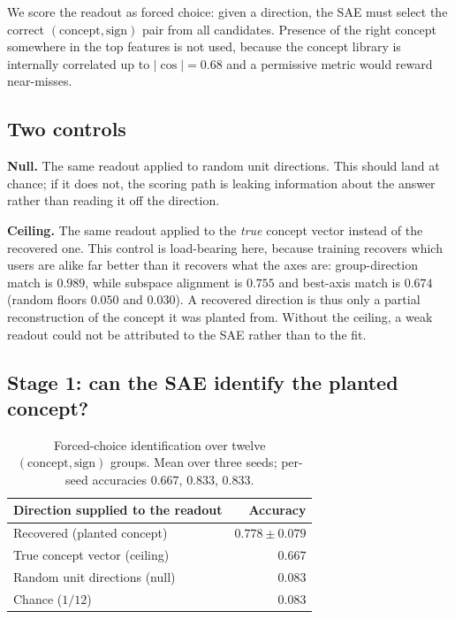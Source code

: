 We score the readout as forced choice: given a direction, the SAE must select
the correct $(\text{concept},\text{sign})$ pair from all candidates. Presence of
the right concept somewhere in the top features is not used, because the concept
library is internally correlated up to $|\cos| = 0.68$ and a permissive metric
would reward near-misses.

\subsection{Two controls}

\textbf{Null.} The same readout applied to random unit directions. This should
land at chance; if it does not, the scoring path is leaking information about
the answer rather than reading it off the direction.

\textbf{Ceiling.} The same readout applied to the \emph{true} concept vector
instead of the recovered one. This control is load-bearing here, because
training recovers which users are alike far better than it recovers what the
axes are: group-direction match is $0.989$, while subspace alignment is $0.755$
and best-axis match is $0.674$ (random floors $0.050$ and $0.030$). A recovered
direction is thus only a partial reconstruction of the concept it was planted
from. Without the ceiling, a weak readout could not be attributed to the SAE
rather than to the fit.

\subsection{Stage 1: can the SAE identify the planted concept?}

\begin{table}[h]
\centering
\begin{tabular}{lr}
\toprule
Direction supplied to the readout & Accuracy \\
\midrule
Recovered (planted concept)       & $0.778 \pm 0.079$ \\
True concept vector (ceiling)     & $0.667$ \\
Random unit directions (null)     & $0.083$ \\
\midrule
Chance ($1/12$)                   & $0.083$ \\
\bottomrule
\end{tabular}
\caption{Forced-choice identification over twelve $(\text{concept},\text{sign})$
groups. Mean over three seeds; per-seed accuracies $0.667$, $0.833$, $0.833$.}
\label{tab:planted-readout}
\end{table}

